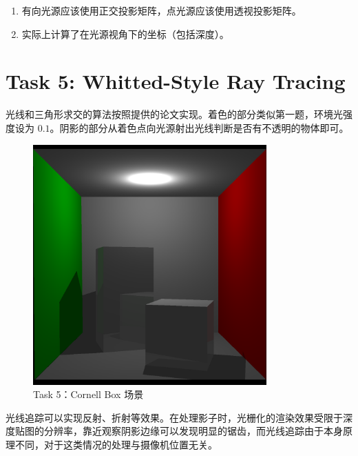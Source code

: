 \documentclass[UTF8]{ctexart}
\begin{document}
\begin{enumerate}
    \item 有向光源应该使用正交投影矩阵，点光源应该使用透视投影矩阵。
    \item 实际上计算了在光源视角下的坐标（包括深度）。
\end{enumerate}

\section*{Task 5: Whitted-Style Ray Tracing}

光线和三角形求交的算法按照提供的论文实现。着色的部分类似第一题，环境光强度设为 $0.1$。阴影的部分从着色点向光源射出光线判断是否有不透明的物体即可。

\begin{figure}[htbp]
    \centering
    \includegraphics[width=0.8\textwidth]{images/5-1.png}
    \caption*{Task 5：Cornell Box 场景}
\end{figure}

光线追踪可以实现反射、折射等效果。在处理影子时，光栅化的渲染效果受限于深度贴图的分辨率，靠近观察阴影边缘可以发现明显的锯齿，而光线追踪由于本身原理不同，对于这类情况的处理与摄像机位置无关。
\end{document}
